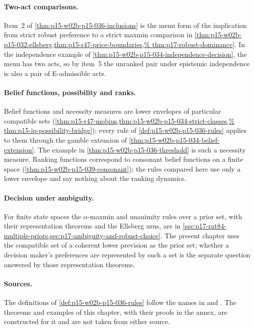 \paragraph{Two-act comparisons.}
Item~2 of \cref{thm:p15-w02b-p15-036-inclusions} is the menu form of the
implication from strict robust preference to a strict maxmin comparison in
\cref{thm:p15-w02b-p15-032-ellsberg,thm:p15-r47-price-boundaries,%
thm:p17-robust-dominance}. In the independence example of
\cref{thm:p15-w02b-p15-034-independence-decision}, the menu has two acts,
so by item~5 the unranked pair under epistemic independence is also a pair
of E-admissible acts.

\paragraph{Belief functions, possibility and ranks.}
Belief functions and necessity measures are lower envelopes of particular
compatible sets (\cref{thm:p15-r47-mobius,thm:p15-w02b-p15-034-strict-classes,%
thm:p15-ip-possibility-bridge}); every rule of
\cref{def:p15-w02b-p15-036-rules} applies to them through the gamble
extension of \cref{thm:p15-w02b-p15-034-belief-extension}. The example in
\cref{thm:p15-w02b-p15-036-threshold} is such a necessity measure. Ranking
functions correspond to consonant belief functions on a finite space
(\cref{thm:p15-w02b-p15-039-consonant}); the rules compared here use only a
lower envelope and say nothing about the ranking dynamics.

\paragraph{Decision under ambiguity.}
For finite state spaces the \(\alpha\)-maxmin and unanimity rules over a
prior set, with their representation theorems and the Ellsberg urns, are in
\cref{sec:p17-rat84-multiple-priors,sec:p17-ambiguity-and-robust-choice}.
The present chapter uses the compatible set of a coherent lower prevision
as the prior set; whether a decision maker's preferences are represented by
such a set is the separate question answered by those representation
theorems.

\paragraph{Sources.}
The definitions of \cref{def:p15-w02b-p15-036-rules} follow the names in
\cite[Sec.~2, p.~497]{Hill2021DecisionUncertainty} and
\cite[§6, p.~37]{MirandaCoherentLowerPrevisionsCapture}. The theorems and
examples of this chapter, with their proofs in the annex, are constructed
for it and are not taken from either source.

